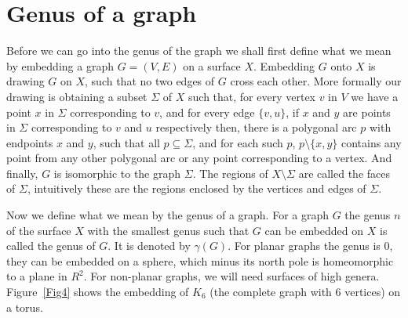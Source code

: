 \documentclass{article}
\begin{document}
\section*{Genus of a graph}\label{sec2.1}
    Before we can go into the genus of the graph we shall first define what we mean by embedding a graph $G = (V, E)$ on a surface $X$.
    Embedding $G$ onto $X$ is drawing $G$ on $X$, such that no two edges of $G$ cross each other. 
    More formally our drawing is obtaining a subset $\Sigma$ of $X$ such that, for every vertex $v$ in $V$ we have a point $x$ in $\Sigma$ corresponding to $v$, 
    and for every edge $\{v,u\}$, if $x$ and $y$ are points in $\Sigma$ corresponding to $v$ and $u$ respectively then, there is a polygonal arc $p$ with endpoints $x$ and $y$, such that all $p \subseteq \Sigma$, and for each such $p$, $p\setminus\{x, y\}$ contains any point from any other polygonal arc or any point corresponding to a vertex.
    And finally, $G$ is isomorphic to the graph $\Sigma$. The regions of $X \setminus \Sigma$ are called the faces of $\Sigma$, intuitively these are the regions enclosed by the vertices and edges of $\Sigma$.

    Now we define what we mean by the genus of a graph. For a graph $G$ the genus $n$ of the surface $X$ with the smallest genus such that $G$ can be embedded on $X$ is called the genus of $G$. 
    It is denoted by $\gamma(G)$. For planar graphs the genus is 0, they can be embedded on a sphere, which minus its north pole is homeomorphic to a plane in $R^2$. For non-planar graphs, we will need surfaces of high genera.
    Figure~\ref*{Fig4} shows the embedding of $K_6$ (the complete graph with 6 vertices) on a torus.
    
\end{document}
